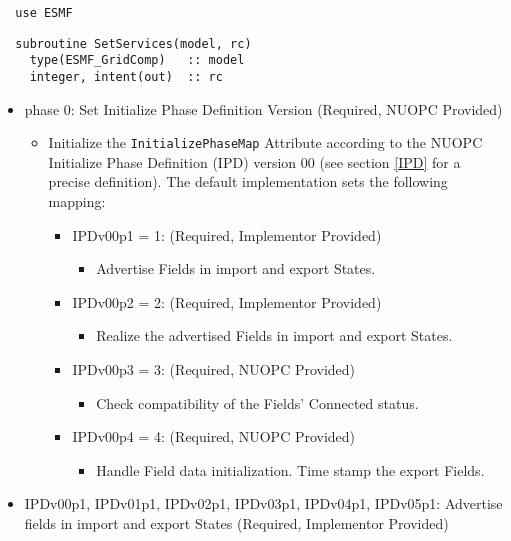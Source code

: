 \begin{verbatim}  use ESMF
\end{verbatim}

\begin{verbatim}  subroutine SetServices(model, rc)
    type(ESMF_GridComp)   :: model
    integer, intent(out)  :: rc
\end{verbatim}

\begin{itemize}
\item phase 0: Set Initialize Phase Definition Version ({\sc Required, NUOPC Provided})
  \begin{itemize}
  \item Initialize the {\tt InitializePhaseMap} Attribute according to the NUOPC Initialize Phase Definition (IPD) version 00 (see section \ref{IPD} for a precise definition). The default implementation sets the following mapping:
    \begin{itemize}
    \item IPDv00p1 = 1: ({\sc Required, Implementor Provided})
      \begin{itemize}
      \item Advertise Fields in import and export States.
      \end{itemize}
    \item IPDv00p2 = 2: ({\sc Required, Implementor Provided})
      \begin{itemize}
      \item Realize the advertised Fields in import and export States.
      \end{itemize}  
    \item IPDv00p3 = 3: ({\sc Required, NUOPC Provided})
      \begin{itemize}
      \item Check compatibility of the Fields' Connected status.
      \end{itemize}
    \item IPDv00p4 = 4: ({\sc Required, NUOPC Provided})
      \begin{itemize}
      \item Handle Field data initialization. Time stamp the export Fields.
      \end{itemize}
    \end{itemize}  
  \end{itemize}  
\item IPDv00p1, IPDv01p1, IPDv02p1, IPDv03p1, IPDv04p1, IPDv05p1: Advertise fields in import and export States ({\sc Required, Implementor Provided})

\end{itemize}
